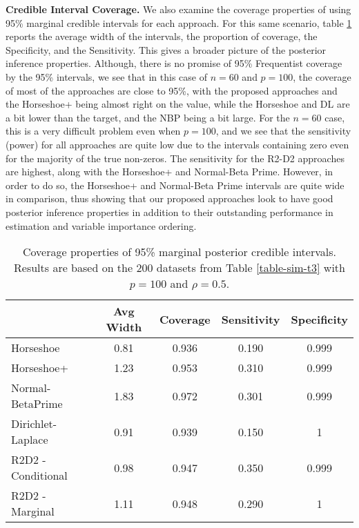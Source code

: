 \documentclass[12pt]{article}
\begin{document}
{\bf Credible Interval Coverage.} We  also examine the coverage properties of using 95\% marginal credible intervals for each approach. For this same scenario, table \ref{table-cover} reports the average width of the intervals, the proportion of coverage, the Specificity, and the Sensitivity. This gives a broader picture of the posterior inference properties. Although, there is no promise of 95\% Frequentist coverage by the 95\% intervals, we see that in this case of $n = 60$ and $p = 100$, the coverage of most of the approaches are close to 95\%, with the proposed approaches and the Horseshoe+ being almost right on the value, while the Horseshoe and DL are a bit lower than the target, and the NBP being a bit large. For the $n=60$ case, this is a very difficult problem even when $p=100$, and we see that the sensitivity  (power) for all approaches are quite low due to the intervals containing zero even for the majority of the true non-zeros. The sensitivity for the R2-D2 approaches are highest, along with the Horseshoe+ and Normal-Beta Prime. However, in order to do so, the Horseshoe+ and Normal-Beta Prime intervals are quite wide in comparison, thus showing that our proposed approaches look to have good posterior inference properties in addition to their outstanding performance in estimation and variable importance ordering.


\begin{table}[htbp]
	\centering
	\renewcommand{\arraystretch}{1.2}
	\begin{tabular}{|l|c|c|c|c|}
		\hline
		& Avg Width & Coverage & Sensitivity & Specificity \\
		\hline
		Horseshoe & 0.81 & 0.936 & 0.190 & 0.999 \\
		\hline
		Horseshoe+& 1.23 & 0.953 & 0.310 & 0.999 \\
		\hline
		Normal-BetaPrime & 1.83 & 0.972 & 0.301 & 0.999 \\
		\hline
		Dirichlet-Laplace & 0.91 & 0.939 & 0.150 & 1 \\
		\hline
		R2D2 - Conditional & 0.98 & 0.947 & 0.350 & 0.999 \\
		\hline
		R2D2 - Marginal & 1.11 & 0.948 & 0.290 & 1 \\
		\hline
	\end{tabular}
	\caption{\normalsize Coverage properties of 95\% marginal posterior credible intervals. Results are based on the 200 datasets from Table \ref{table-sim-t3} with $p = 100$ and $\rho = 0.5$.}
	\label{table-cover}
\end{table}
\end{document}
